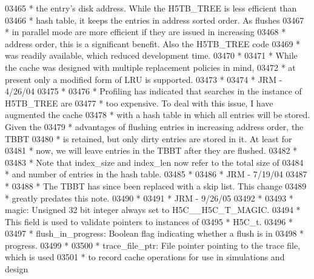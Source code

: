 \begin{DoxyCode}
03465 \textcolor{comment}{ * the entry's disk address.  While the H5TB\_TREE is less efficient than}
03466 \textcolor{comment}{ * hash table, it keeps the entries in address sorted order.  As flushes}
03467 \textcolor{comment}{ * in parallel mode are more efficient if they are issued in increasing}
03468 \textcolor{comment}{ * address order, this is a significant benefit.  Also the H5TB\_TREE code}
03469 \textcolor{comment}{ * was readily available, which reduced development time.}
03470 \textcolor{comment}{ *}
03471 \textcolor{comment}{ * While the cache was designed with multiple replacement policies in mind,}
03472 \textcolor{comment}{ * at present only a modified form of LRU is supported.}
03473 \textcolor{comment}{ *}
03474 \textcolor{comment}{ *                                              JRM - 4/26/04}
03475 \textcolor{comment}{ *}
03476 \textcolor{comment}{ * Profiling has indicated that searches in the instance of H5TB\_TREE are}
03477 \textcolor{comment}{ * too expensive.  To deal with this issue, I have augmented the cache}
03478 \textcolor{comment}{ * with a hash table in which all entries will be stored.  Given the}
03479 \textcolor{comment}{ * advantages of flushing entries in increasing address order, the TBBT}
03480 \textcolor{comment}{ * is retained, but only dirty entries are stored in it.  At least for}
03481 \textcolor{comment}{ * now, we will leave entries in the TBBT after they are flushed.}
03482 \textcolor{comment}{ *}
03483 \textcolor{comment}{ * Note that index\_size and index\_len now refer to the total size of}
03484 \textcolor{comment}{ * and number of entries in the hash table.}
03485 \textcolor{comment}{ *}
03486 \textcolor{comment}{ *                      JRM - 7/19/04}
03487 \textcolor{comment}{ *}
03488 \textcolor{comment}{ * The TBBT has since been replaced with a skip list.  This change}
03489 \textcolor{comment}{ * greatly predates this note.}
03490 \textcolor{comment}{ *}
03491 \textcolor{comment}{ *                      JRM - 9/26/05}
03492 \textcolor{comment}{ *}
03493 \textcolor{comment}{ * magic:   Unsigned 32 bit integer always set to H5C\_\_H5C\_T\_MAGIC. }
03494 \textcolor{comment}{ *      This field is used to validate pointers to instances of}
03495 \textcolor{comment}{ *      H5C\_t.}
03496 \textcolor{comment}{ *}
03497 \textcolor{comment}{ * flush\_in\_progress: Boolean flag indicating whether a flush is in}
03498 \textcolor{comment}{ *      progress.}
03499 \textcolor{comment}{ *}
03500 \textcolor{comment}{ * trace\_file\_ptr:  File pointer pointing to the trace file, which is used}
03501 \textcolor{comment}{ *              to record cache operations for use in simulations and design}

\end{DoxyCode}
